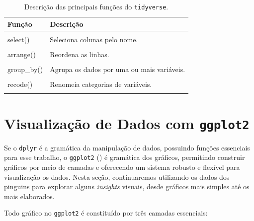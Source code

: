 \documentclass[
  12pt,
  letterpaper,
  DIV=11,
  numbers=noendperiod]{scrreprt}
\theoremstyle{definition}
\theoremstyle{exemplo}
\begin{document}
\begin{longtable}[t]{ll}

\caption{\label{tbl-dplyr-fcts}Descrição das principais funções do
\texttt{tidyverse}.}

\tabularnewline

\toprule
Função & Descrição\\
\midrule
\cellcolor{gray!10}{glimpse()} & \cellcolor{gray!10}{Inspecionar conjuntos de dados.}\\
select() & Seleciona colunas pelo nome.\\
\cellcolor{gray!10}{filter()} & \cellcolor{gray!10}{Filtra linhas com base em seus valores.}\\
arrange() & Reordena as linhas.\\
\cellcolor{gray!10}{mutate()} & \cellcolor{gray!10}{Cria novas colunas (variáveis).}\\
\addlinespace
group\_by() & Agrupa os dados por uma ou mais variáveis.\\
\cellcolor{gray!10}{summarise()} & \cellcolor{gray!10}{Reduz múltiplos valores a um único resumo.}\\
recode() & Renomeia categorias de variáveis.\\
\cellcolor{gray!10}{n()} & \cellcolor{gray!10}{Conta o número de observações.}\\
\bottomrule

\end{longtable}

\section{\texorpdfstring{Visualização de Dados com
\texttt{ggplot2}}{Visualização de Dados com ggplot2}}\label{visualizauxe7uxe3o-de-dados-com-ggplot2}

Se o \texttt{dplyr} é a gramática da manipulação de dados, possuindo
funções essenciais para esse trabalho, o \texttt{ggplot2}
() é gramática dos
gráficos, permitindo construir gráficos por meio de camadas e oferecendo
um sistema robusto e flexível para visualização os dados. Nesta seção,
continuaremos utilizando os dados dos pinguins para explorar alguns
\emph{insights} visuais, desde gráficos mais simples até os mais
elaborados.

Todo gráfico no \texttt{ggplot2} é constituído por três camadas
essenciais:
\end{document}
